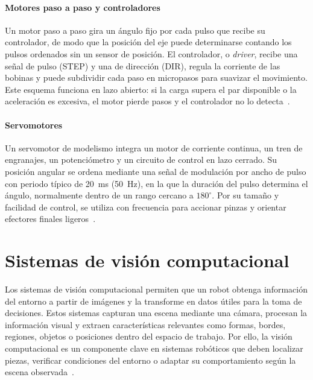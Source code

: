 \paragraph{Motores paso a paso y controladores} Un motor paso a paso gira un ángulo fijo por cada pulso que recibe su controlador, de modo que la posición del eje puede determinarse contando los pulsos ordenados sin un sensor de posición. El controlador, o \textit{driver}, recibe una señal de pulso (STEP) y una de dirección (DIR), regula la corriente de las bobinas y puede subdividir cada paso en micropasos para suavizar el movimiento. Este esquema funciona en lazo abierto: si la carga supera el par disponible o la aceleración es excesiva, el motor pierde pasos y el controlador no lo detecta~\cite{bolton2015mechatronics,orientalSteppingMotors}.

\paragraph{Servomotores} Un servomotor de modelismo integra un motor de corriente continua, un tren de engranajes, un potenciómetro y un circuito de control en lazo cerrado. Su posición angular se ordena mediante una señal de modulación por ancho de pulso con periodo típico de 20~ms (50~Hz), en la que la duración del pulso determina el ángulo, normalmente dentro de un rango cercano a $180^\circ$. Por su tamaño y facilidad de control, se utiliza con frecuencia para accionar pinzas y orientar efectores finales ligeros~\cite{bolton2015mechatronics}.

\section{Sistemas de visión computacional}
Los sistemas de visión computacional permiten que un robot obtenga información del entorno a partir de imágenes y la transforme en datos útiles para la toma de decisiones. Estos sistemas capturan una escena mediante una cámara, procesan la información visual y extraen características relevantes como formas, bordes, regiones, objetos o posiciones dentro del espacio de trabajo. Por ello, la visión computacional es un componente clave en sistemas robóticos que deben localizar piezas, verificar condiciones del entorno o adaptar su comportamiento según la escena observada~\cite{corke2017robotics,correll2022autonomous}.


